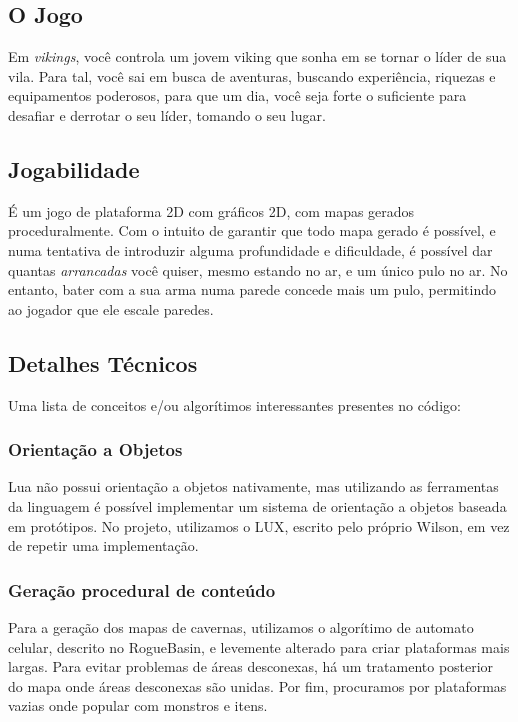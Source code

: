   \subsection{O Jogo}
    Em \textit{vikings}, você controla um jovem viking que sonha em se tornar o líder de sua vila. Para tal,
    você sai em busca de aventuras, buscando experiência, riquezas e equipamentos poderosos, para que um dia,
    você seja forte o suficiente para desafiar e derrotar o seu líder, tomando o seu lugar.
        
  \subsection{Jogabilidade}
    É um jogo de plataforma 2D com gráficos 2D, com mapas gerados proceduralmente. Com o intuito de garantir
    que todo mapa gerado é possível, e numa tentativa de introduzir alguma profundidade e dificuldade, é
    possível dar quantas \textit{arrancadas} você quiser, mesmo estando no ar, e um único pulo no ar. No
    entanto, bater com a sua arma numa parede concede mais um pulo, permitindo ao jogador que ele escale
    paredes.
    
  \subsection{Detalhes Técnicos}
    Uma lista de conceitos e/ou algorítimos interessantes presentes no código:
    
    \subsubsection{Orientação a Objetos}
      Lua não possui orientação a objetos nativamente, mas utilizando as ferramentas da linguagem é possível
      implementar um sistema de orientação a objetos baseada em protótipos.
      No projeto, utilizamos o LUX\footnotemark, escrito pelo próprio Wilson, em vez de repetir uma implementação.
      
    
    \subsubsection{Geração procedural de conteúdo}
      Para a geração dos mapas de cavernas, utilizamos o algorítimo de automato celular, descrito no RogueBasin,
      \cite{website:roguebasin-cellularautomata} e levemente alterado para criar plataformas mais largas. Para
      evitar problemas de áreas desconexas, há um tratamento posterior do mapa onde áreas desconexas são unidas.
      Por fim, procuramos por plataformas vazias onde popular com monstros e itens.